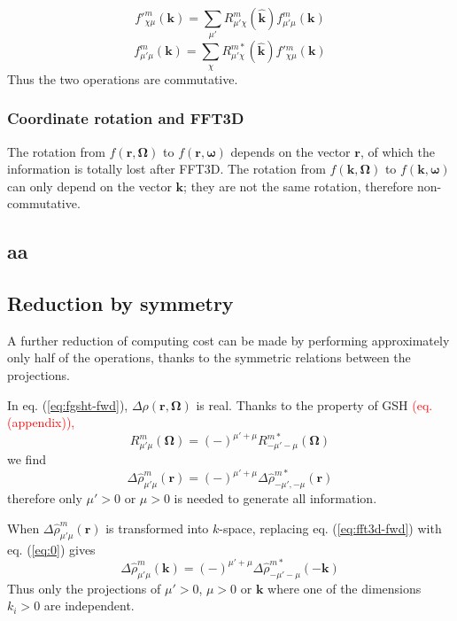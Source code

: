 \[
f'_{\chi\mu}^{m}(\mathbf{k})=\sum_{\mu'}R_{\mu'\chi}^{m}(\hat{\mathbf{k}})f_{\mu'\mu}^{m}(\mathbf{k})
\]
\[
f_{\mu'\mu}^{m}(\mathbf{k})=\sum_{\chi}R_{\mu'\chi}^{m*}(\hat{\mathbf{k}})f'{}_{\chi\mu}^{m}(\mathbf{k})
\]
Thus the two operations are commutative.

\subsubsection{Coordinate rotation and FFT3D}

The rotation from $f(\mathbf{r},\mathbf{\Omega})$ to $f(\mathbf{r},\boldsymbol{\omega})$
depends on the vector $\mathbf{r}$, of which the information is totally
lost after FFT3D. The rotation from $f(\mathbf{k},\mathbf{\Omega})$
to $f(\mathbf{k},\boldsymbol{\omega})$ can only depend on the vector
$\mathbf{k}$; they are not the same rotation, therefore non-commutative. 

\subsection{aa}

\subsection{Reduction by symmetry\label{subsec:Reduction-by-symmetry}}

A further reduction of computing cost can be made by performing approximately
only half of the operations, thanks to the symmetric relations between
the projections.

In eq. (\ref{eq:fgsht-fwd}), $\Delta\rho(\mathbf{r},\mathbf{\Omega})$
is real. Thanks to the property of \acs{GSH} \textcolor{red}{(eq.
(appendix)),}
\[
R_{\mu'\mu}^{m}(\mathbf{\Omega})=(-)^{\mu'+\mu}R_{-\mu'-\mu}^{m*}(\mathbf{\Omega})
\]
we find
\begin{equation}
\Delta\hat{\rho}_{\mu'\mu}^{m}(\mathbf{r})=(-)^{\mu'+\mu}\Delta\hat{\rho}_{-\mu',-\mu}^{m*}(\mathbf{r})\label{eq:0}
\end{equation}
therefore only $\mu'>0$ or $\mu>0$ is needed to generate all information.

When $\Delta\hat{\rho}_{\mu'\mu}^{m}(\mathbf{r})$ is transformed
into $k$-space, replacing eq. (\ref{eq:fft3d-fwd}) with eq. (\ref{eq:0})
gives
\begin{equation}
\Delta\hat{\rho}_{\mu'\mu}^{m}(\mathbf{k})=(-)^{\mu'+\mu}\Delta\hat{\rho}_{-\mu'-\mu}^{m*}(-\mathbf{k})\label{eq:1}
\end{equation}
Thus only the projections of $\mu'>0$, $\mu>0$ or $\mathbf{k}$
where one of the dimensions $k_{i}>0$ are independent.

